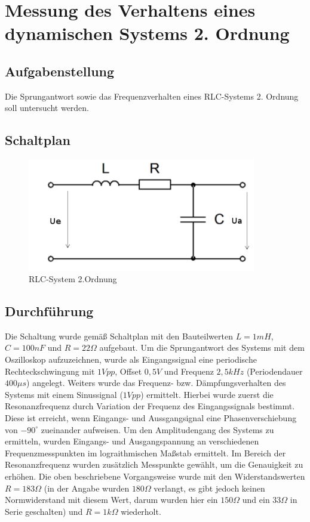 \documentclass[12pt,a4paper,titlepage]{article}
\begin{document}
\section{Messung des Verhaltens eines dynamischen Systems 2. Ordnung}

\subsection{Aufgabenstellung}
Die Sprungantwort sowie das Frequenzverhalten eines RLC-Systems 2. Ordnung soll untersucht werden.

\subsection{Schaltplan}
\begin{figure}[H]
  \centering
  \includegraphics[width=100mm]{rlc_schaltplan.png}
  \caption{RLC-System 2.Ordnung}
\end{figure}

\subsection{Durchf\"uhrung}
Die Schaltung wurde gem\"aß Schaltplan mit den Bauteilwerten $L=1mH$, $C=100nF$ und $R=22\Omega$ aufgebaut. Um die Sprungantwort des Systems mit dem Oszilloskop aufzuzeichnen, wurde als Eingangssignal eine periodische Rechteckschwingung mit $1Vpp$, Offset $0,5V$ und Frequenz $2,5kHz$ (Periodendauer $400\mu s$) angelegt. Weiters wurde das Frequenz- bzw. D\"ampfungsverhalten des Systems mit einem Sinussignal ($1Vpp$) ermittelt. Hierbei wurde zuerst die Resonanzfrequenz durch Variation der Frequenz des Eingangssignals bestimmt. Diese ist erreicht, wenn Eingangs- und Aussgangsignal eine Phasenverschiebung von $-90^{\circ}$ zueinander aufweisen. Um den Amplitudengang des Systems zu ermitteln, wurden Eingangs- und Ausgangspannung an verschiedenen Frequenzmesspunkten im lograithmischen Maßstab ermittelt. Im Bereich der Resonanzfrequenz wurden zusätzlich Messpunkte gewählt, um die Genauigkeit zu erhöhen. Die oben beschriebene Vorgangsweise wurde mit den Widerstandswerten $R = 183 \Omega$ (in der Angabe wurden $180\Omega$ verlangt, es gibt jedoch keinen Normwiderstand mit diesem Wert, darum wurden hier ein $150\Omega$ und ein $33\Omega$ in Serie geschalten) und $R = 1k\Omega$ wiederholt.
\end{document}

